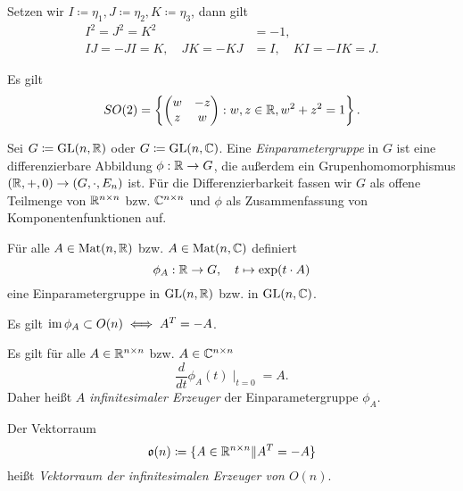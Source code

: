 \documentclass{cheat-sheet}
\newcommand{\GL}{\mathrm{GL}}
\newcommand{\Mat}{\mathrm{Mat}}
\begin{document}
\begin{definition}
Setzen wir $I \coloneqq \eta_1, J \coloneqq \eta_2, K \coloneqq \eta_3$, dann gilt
\begin{align*}
I^2 = J^2 = K^2 &= -1, \\
IJ = -JI = K, \quad JK = -KJ &= I, \quad KI = -IK = J.
\end{align*}
\end{definition}

\begin{satz}
Es gilt
\[ SO(2) = \left\{ \begin{pmatrix} w & -z \\ z & w \end{pmatrix} : w, z \in \mathbb{R}, w^2 + z^2 = 1 \right\}. \]
\end{satz}


\begin{definition}
Sei $G \coloneqq \GL(n, \R)$ oder $G \coloneqq \GL(n, \C)$. Eine \emph{Einparametergruppe} in $G$ ist eine differenzierbare Abbildung $\phi : \mathbb{R} \to G$, die außerdem ein Grupenhomomorphismus $(\mathbb{R}, +, 0) \to (G, \cdot, E_n)$ ist. Für die Differenzierbarkeit fassen wir $G$ als offene Teilmenge von $\mathbb{R}^{n \times n}$ bzw. $\mathbb{C}^{n \times n}$ und $\phi$ als Zusammenfassung von Komponentenfunktionen auf.
\end{definition}

\begin{satz}
Für alle $A \in \Mat(n, \R)$ bzw. $A \in \Mat(n, \C)$ definiert
\[ \phi_A : \mathbb{R} \to G, \quad t \mapsto \exp(t \cdot A) \]
eine Einparametergruppe in $\GL(n, \R)$ bzw. in $\GL(n, \C)$.
\end{satz}

\begin{satz}
Es gilt $\mathop{\mathrm{im}} \phi_A \subset O(n) \iff A^T = -A$.
\end{satz}

\begin{bem}
Es gilt für alle $A \in \mathbb{R}^{n \times n}$ bzw. $A \in \mathbb{C}^{n \times n}$
\[ \frac{d}{dt} \phi_A(t) \mid_{t=0} = A. \]
Daher heißt $A$ \emph{infinitesimaler Erzeuger} der Einparametergruppe $\phi_A$.
\end{bem}

\begin{definition}
Der Vektorraum
\[ \mathfrak{o}(n) \coloneqq \{ A \in \mathbb{R}^{n \times n} \| A^T = - A \} \]
heißt \emph{Vektorraum der infinitesimalen Erzeuger von $O(n)$}.
\end{definition}
\end{document}
